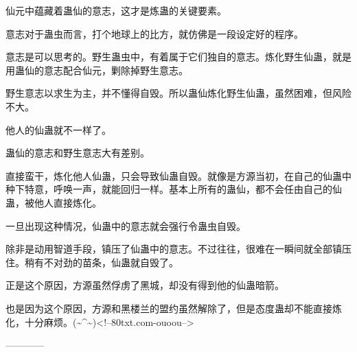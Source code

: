 \begin{this_body}
仙元中蕴藏着蛊仙的意志，这才是炼蛊的关键要素。

意志对于蛊虫而言，打个地球上的比方，就仿佛是一段设定好的程序。

意志是可以思考的。野生蛊虫中，有着属于它们独自的意志。炼化野生仙蛊，就是用蛊仙的意志配合仙元，剿除掉野生意志。

野生意志以求生为主，并不懂得自毁。所以蛊仙炼化野生仙蛊，虽然困难，但风险不大。

他人的仙蛊就不一样了。

蛊仙的意志和野生意志大有差别。

直接蛮干，炼化他人仙蛊，只会导致仙蛊自毁。就像是方源当初，在自己的仙蛊中种下特意，呼唤一声，就能回归一样。基本上所有的蛊仙，都不会任由自己的仙蛊，被他人直接炼化。

一旦出现这种情况，仙蛊中的意志就会强行令蛊虫自毁。

除非是动用智道手段，镇压了仙蛊中的意志。不过往往，很难在一瞬间就全部镇压住。稍有不对劲的苗条，仙蛊就自毁了。

正是这个原因，方源虽然俘虏了黑城，却没有得到他的仙蛊暗箭。

也是因为这个原因，方源和黑楼兰的盟约虽然解除了，但是态度蛊却不能直接炼化，十分麻烦。(\~{}\^{}\~{})<!--80txt.com-ouoou-->

------------

\end{this_body}

